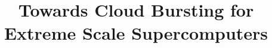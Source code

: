 \documentclass[JIP,draft]{ipsj}
\begin{document}
\title{Towards Cloud Bursting for Extreme Scale Supercomputers}









\end{document}
